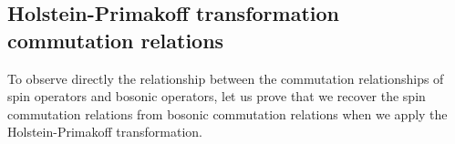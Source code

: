 \documentclass[a4paper]{report}
\begin{document}
\begin{spacing}{1.1}



\newpage
{}






\newpage

\begin{appendices}

\section{Holstein-Primakoff transformation commutation relations}

To observe directly the relationship between the commutation relationships of spin operators and bosonic operators, let us prove that we recover the spin commutation relations from bosonic commutation relations when we apply the Holstein-Primakoff transformation.


\end{appendices}
\end{spacing}
\end{document}
